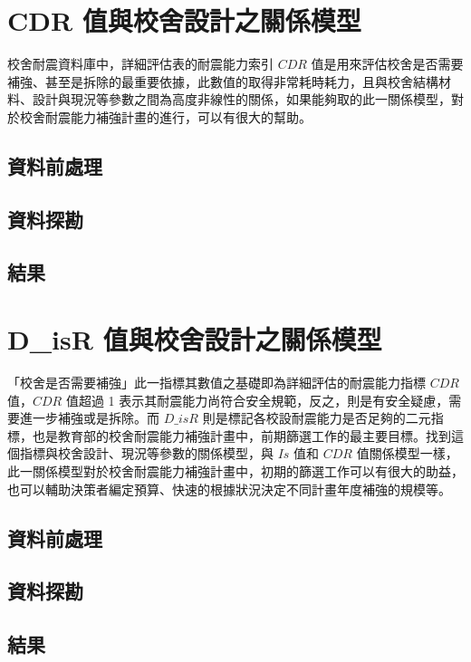 \section{CDR 值與校舍設計之關係模型}

校舍耐震資料庫中，詳細評估表的耐震能力索引 $CDR$ 值是用來評估校舍是否需要補強、甚至是拆除的最重要依據，此數值的取得非常耗時耗力，且與校舍結構材料、設計與現況等參數之間為高度非線性的關係，如果能夠取的此一關係模型，對於校舍耐震能力補強計畫的進行，可以有很大的幫助。

\subsection{資料前處理}
\subsection{資料探勘}
\subsection{結果}


\section{D\_isR 值與校舍設計之關係模型}

「校舍是否需要補強」此一指標其數值之基礎即為詳細評估的耐震能力指標 $CDR$ 值，$CDR$ 值超過 1 表示其耐震能力尚符合安全規範，反之，則是有安全疑慮，需要進一步補強或是拆除。而 $D\_isR$ 則是標記各校設耐震能力是否足夠的二元指標，也是教育部的校舍耐震能力補強計畫中，前期篩選工作的最主要目標。找到這個指標與校舍設計、現況等參數的關係模型，與 $Is$ 值和 $CDR$ 值關係模型一樣，此一關係模型對於校舍耐震能力補強計畫中，初期的篩選工作可以有很大的助益，也可以輔助決策者編定預算、快速的根據狀況決定不同計畫年度補強的規模等。

\subsection{資料前處理}
\subsection{資料探勘}
\subsection{結果}

